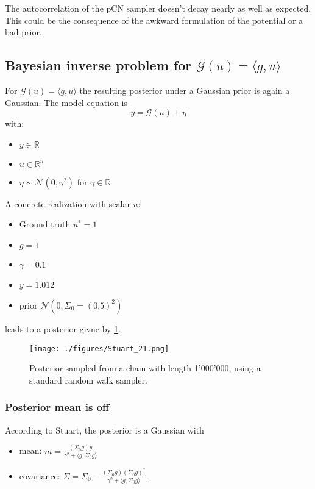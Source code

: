 \documentclass[11pt]{article}
\newcommand{\R}{{\mathbb{R}}}
\newcommand{\G}[1]{{\mathcal{G} \left( #1 \right)}}
\newcommand{\N}[2]{\mathcal{N}\left(#1,#2\right)}
\begin{document}
The autocorrelation of the pCN sampler doesn't decay nearly as well as expected.
This could be the consequence of the awkward formulation of the potential or a bad prior.

\subsection{Bayesian inverse problem for \(\G{u} = \langle g,u \rangle\)}
\label{sec:org5b8ca3f}
For \(\G{u} = \langle g,u \rangle\) the resulting posterior under a Gaussian prior
is again a Gaussian. The model equation is
$$y = \G{u} + \eta$$
with:
\begin{itemize}
\item \(y \in \R\)
\item \(u \in \R^n\)
\item \(\eta \sim \N{0}{\gamma^2}\) for \(\gamma \in \R\)
\end{itemize}

A concrete realization with scalar \(u\):
\begin{itemize}
\item Ground truth \(u^* = 1\)
\item \(g = 1\)
\item \(\gamma = 0.1\)
\item \(y = 1.012\)
\item prior \(\N{0}{\Sigma_0=(0.5)^2}\)
\end{itemize}
leads to a posterior givne by \ref{fig:stuart_21_density}.

\begin{figure}[htbp]
\centering
\texttt{[image: ./figures/Stuart\_21.png]}
\caption{\label{fig:stuart_21_density}
Posterior sampled from a chain with length 1'000'000, using a standard random walk sampler.}
\end{figure}

\subsubsection{Posterior mean is off}
\label{sec:orgacf5667}

According to Stuart, the posterior is a Gaussian with

\begin{itemize}
\item mean: \(m = \frac{(\Sigma_0 g) y}{\gamma^2 + \langle g, \Sigma_0g \rangle}\)
\item covariance: \(\Sigma = \Sigma_0 - \frac{(\Sigma_0 g)(\Sigma_0 g)^*}{\gamma^2 + \langle g, \Sigma_0g \rangle}\).
\end{itemize}
\end{document}
